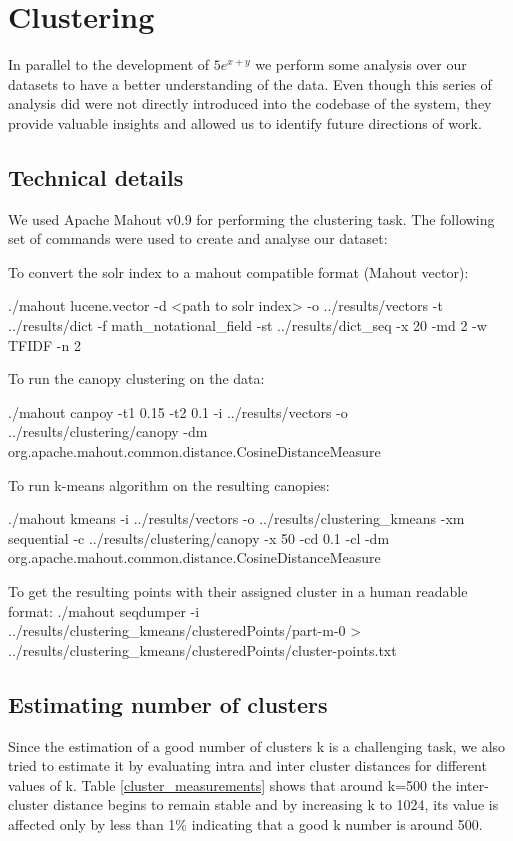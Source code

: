 \chapter{Clustering}
\label{chap-clustering}

In parallel to the development of $5e^{x+y}$ we perform some analysis over our datasets to have a better understanding of the data. Even though this series of analysis did were not directly introduced into the codebase of the system, they provide valuable insights and allowed us to identify future directions of work.

\section{Technical details}

We used Apache Mahout v0.9\cite{mahout} for performing the clustering task. 
The following set of commands were used to create and analyse our dataset:

To convert the solr index to a mahout compatible format (Mahout vector):

\small{{\codefont ./mahout lucene.vector -d <path to solr index>  -o ../results/vectors -t ../results/dict -f math\_notational\_field -st ../results/dict\_seq -x 20 -md 2 -w TFIDF -n 2}}

To run the canopy clustering on the data:

\small{{\codefont ./mahout canpoy -t1 0.15 -t2 0.1 -i ../results/vectors -o ../results/clustering/canopy -dm org.apache.mahout.common.distance.CosineDistanceMeasure}}

To run k-means algorithm on the resulting canopies:

\small{{\codefont ./mahout kmeans -i ../results/vectors -o ../results/clustering\_kmeans -xm sequential  -c ../results/clustering/canopy -x 50 -cd 0.1 -cl -dm org.apache.mahout.common.distance.CosineDistanceMeasure}}

To get the resulting points with their assigned cluster in a human readable format:
\small{{\codefont ./mahout seqdumper -i ../results/clustering\_kmeans/clusteredPoints/part-m-0 > ../results/clustering\_kmeans/clusteredPoints/cluster-points.txt}}

\section{Estimating number of clusters}

Since the estimation of a good number of clusters k is a challenging task, we also tried to estimate it  by evaluating intra and inter cluster distances for different values of k. Table \ref{cluster_measurements} shows that around k=500 the inter-cluster distance begins to remain stable and by increasing k to 1024, its value is affected only by less than 1\% indicating that a good k number is around 500.

